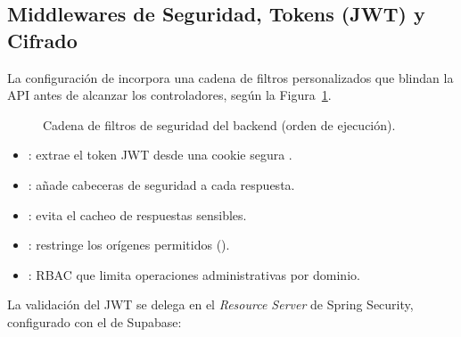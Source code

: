\subsection{Middlewares de Seguridad, Tokens (JWT) y Cifrado}
\label{ssec:s1_be_middlewares}
La configuración de  incorpora una cadena de filtros personalizados que blindan
la API antes de alcanzar los controladores, según la Figura~\ref{fig:s1_filtros}.

\begin{figure}[!ht]
    \centering
    \caption{Cadena de filtros de seguridad del backend (orden de ejecución).}
    \label{fig:s1_filtros}
\end{figure}

\begin{itemize}[noitemsep]
    \item {}: extrae el token JWT desde una cookie segura .
    \item {}: añade cabeceras de seguridad a cada respuesta.
    \item {}: evita el cacheo de respuestas sensibles.
    \item {}: restringe los orígenes permitidos ().
    \item {}: RBAC que limita operaciones administrativas por dominio.
\end{itemize}

La validación del JWT se delega en el \textit{Resource Server} de Spring Security, configurado
con el  de Supabase:

